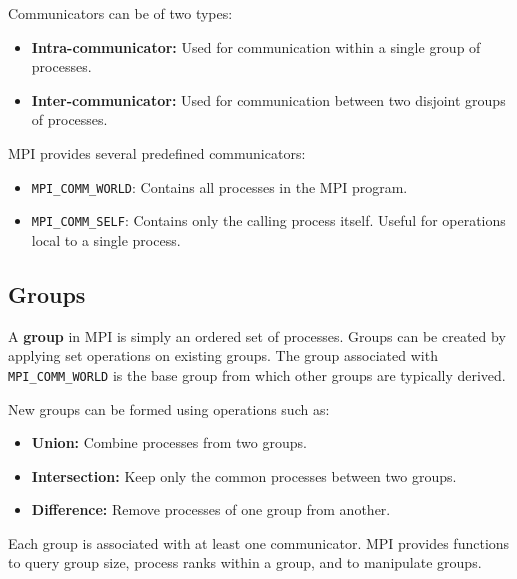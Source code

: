 \documentclass[12pt]{book}
\begin{document}
Communicators can be of two types:
\begin{itemize}
    \item \textbf{Intra-communicator:} Used for communication within a single group of processes.
    \item \textbf{Inter-communicator:} Used for communication between two disjoint groups of processes.
\end{itemize}

MPI provides several predefined communicators:
\begin{itemize}
    \item \texttt{MPI\_COMM\_WORLD}: Contains all processes in the MPI program.
    \item \texttt{MPI\_COMM\_SELF}: Contains only the calling process itself. Useful for operations local to a single process.
\end{itemize}

\subsection{Groups}
A \textbf{group} in MPI is simply an ordered set of processes. Groups can be created by applying set operations on existing groups. The group associated with \texttt{MPI\_COMM\_WORLD} is the base group from which other groups are typically derived.  

New groups can be formed using operations such as:
\begin{itemize}
    \item \textbf{Union:} Combine processes from two groups.
    \item \textbf{Intersection:} Keep only the common processes between two groups.
    \item \textbf{Difference:} Remove processes of one group from another.
\end{itemize}

Each group is associated with at least one communicator. MPI provides functions to query group size, process ranks within a group, and to manipulate groups.
\end{document}
